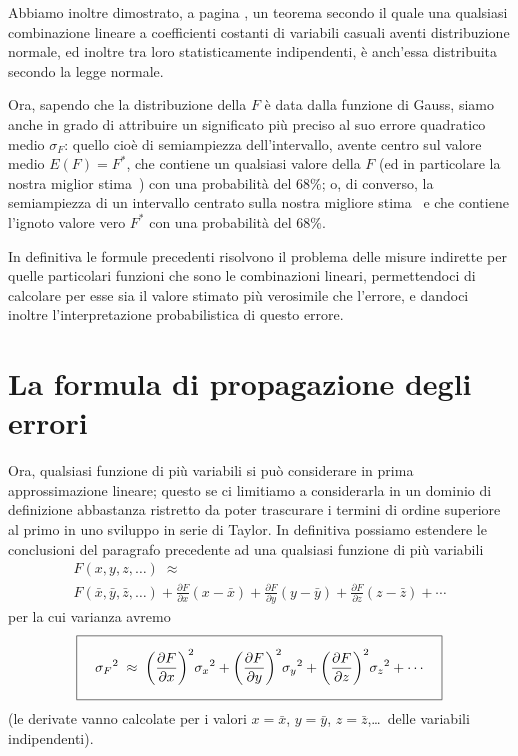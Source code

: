 Abbiamo inoltre dimostrato, a pagina \pageref{th:8.colino},
un teorema secondo il quale una qualsiasi combinazione
lineare a coefficienti costanti di variabili casuali aventi
distribuzione normale, ed inoltre tra loro statisticamente
indipendenti, \`e anch'essa distribuita secondo la legge
normale.

Ora, sapendo che la distribuzione della $F$ \`e data dalla
funzione di Gauss, siamo anche in grado di attribuire un
significato pi\`u preciso al suo errore quadratico medio
$\sigma_F$: quello cio\`e di semiampiezza dell'intervallo,
avente centro sul valore medio $E(F) = F^*$, che contiene un
qualsiasi valore della $F$ (ed in particolare la nostra
miglior stima \,) con una probabilit\`a del 68\%; o,
di converso, la semiampiezza di un intervallo centrato sulla
nostra migliore stima \ e che contiene l'ignoto valore
vero $F^*$ con una probabilit\`a del 68\%.

In definitiva le formule precedenti risolvono il problema
delle misure indirette per quelle particolari funzioni che
sono le combinazioni lineari, permettendoci di calcolare per
esse sia il valore stimato pi\`u verosimile che l'errore, e
dandoci inoltre l'interpretazione probabilistica di questo
errore.

\section{La formula di propagazione degli errori}%
Ora, qualsiasi funzione di pi\`u variabili si pu\`o
considerare in prima approssimazione lineare; questo se ci
limitiamo a considerarla in un dominio di definizione
abbastanza ristretto da poter trascurare i termini di ordine
superiore al primo in uno sviluppo in serie di Taylor.  In
definitiva possiamo estendere le conclusioni del paragrafo
precedente ad una qualsiasi funzione di pi\`u variabili
\begin{multline*}
  F(x,y,z,\ldots) \; \approx \\
  F (\bar x, \bar y, \bar z,\ldots) +
  \frac{\partial F}{\partial x} \left( x - \bar x \right) +
  \frac{\partial F}{\partial y} \left( y - \bar y \right) +
  \frac{\partial F}{\partial z} \left( z - \bar z \right)
  +\cdots
\end{multline*}
per la cui varianza avremo
\begin{equation} \label{eq:10.proper}
  \boxed{ \rule[-6mm]{0mm}{14mm} \quad
    {\sigma_F}^2 \; \approx \;
    \left( \dfrac{\partial F}{\partial x}
      \right)^2 \! {\sigma_x}^2 +
    \left( \dfrac{\partial F}{\partial y}
      \right)^2 \! {\sigma_y}^2 +
    \left( \dfrac{\partial F}{\partial z}
      \right)^2 \! {\sigma_z}^2
      +\cdots \quad }
\end{equation}
(le derivate vanno calcolate per i valori $x = \bar x$, $y =
\bar y$, $z = \bar z$,\ldots\ delle variabili indipendenti).


